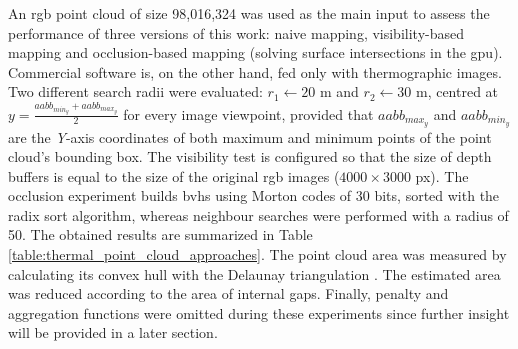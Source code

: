 An \acrshort{rgb} point cloud of size 98,016,324 was used as the main input to assess the performance of three versions of this work: naive mapping, visibility-based mapping and occlusion-based mapping (solving surface intersections in the \acrshort{gpu}). Commercial software is, on the other hand, fed only with thermographic images. Two different search radii were evaluated: $r_1 \gets 20$ \si{\meter} and $r_2 \gets 30$ \si{\meter}, centred at $y = \frac{\textit{aabb}_{\textit{min}_{y}} + \textit{aabb}_{\textit{max}_{y}}}{2}$ for every image viewpoint, provided that $\textit{aabb}_{\textit{max}_{y}}$ and $\textit{aabb}_{\textit{min}_{y}}$ are the \textit{Y}-axis coordinates of both maximum and minimum points of the point cloud's bounding box. The visibility test is configured so that the size of depth buffers is equal to the size of the original \acrshort{rgb} images ($4000 \times 3000$ px). The occlusion experiment builds \acrshort{bvh}s using Morton codes of 30 bits, sorted with the radix sort algorithm, whereas neighbour searches were performed with a radius of 50. The obtained results are summarized in Table \ref{table:thermal_point_cloud_approaches}. The point cloud area was measured by calculating its convex hull with the Delaunay triangulation \cite{shewchuk_delaunay_2002}. The estimated area was reduced according to the area of internal gaps. Finally, penalty and aggregation functions were omitted during these experiments since further insight will be provided in a later section. 

